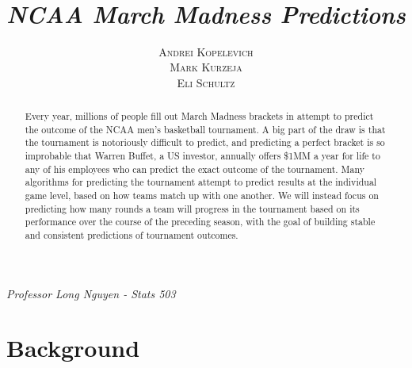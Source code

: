 \documentclass[10pt,a4paper, hidelinks]{article} %
\begin{document}
\pagestyle{plain} 
\title{\color{harvard}\rmfamily{} \\ \vspace{-.4cm}\hfill\\ {\LARGE \textit{NCAA March Madness Predictions}}}
\author{\textsc{Andrei Kopelevich}\\ \textsc{Mark Kurzeja}\\ \textsc{Eli Schultz} }
\date{} %

\maketitle

\mbox{}
\vfill

\begin{center}
	\large \color{harvard}   \textit{Professor Long Nguyen - Stats 503} \\  
\end{center}
\thispagestyle{empty}
\newpage

\hfill
\vspace{1cm}\hfill

\begin{abstract}
	Every year, millions of people fill out March Madness brackets in attempt to predict the outcome of the NCAA men's basketball tournament. A big part of the draw is that the tournament is notoriously difficult to predict, and predicting a perfect bracket is so improbable that Warren Buffet, a US investor, annually offers \$1MM a year for life to any of his employees who can predict the exact outcome of the tournament. Many algorithms for predicting the tournament attempt to predict results at the individual game level, based on how teams match up with one another. We will instead focus on predicting how many rounds a team will progress in the tournament based on its performance over the course of the preceding season, with the goal of building stable and consistent predictions of tournament outcomes.
\end{abstract}
\tableofcontents
\thispagestyle{empty}
\newpage

\section{Background}
\end{document}
